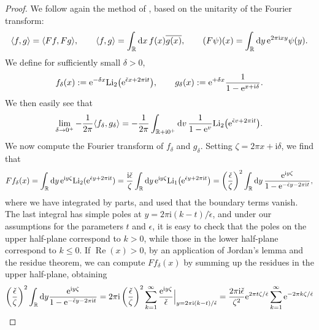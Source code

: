 \documentclass[pdftex]{sigma}
\numberwithin{equation}{section}
\begin{document}
\begin{proof}
We follow again the method of \cite{garoufalidis2020resurgence}, based on the unitarity of the
Fourier transform:
\[
\langle f,g\rangle=\langle Ff,Fg\rangle,\qquad \langle f,g\rangle=\int_{\mathbb{R}} \mathrm{d}x\, f(x)\overline{g(x)}, \qquad (F\psi)(x)=\int_{\mathbb{R}} {\rm d}y\, {\rm e}^{2\pi\mathrm{i} xy}\psi(y).
\]
We define for sufficiently small $\delta>0$,
\begin{equation*}
f_\delta(x):={\rm e}^{-\delta x}{\rm Li}_2\big({\rm e}^{\check\epsilon x
+2\pi \mathrm{i} t}\big),\qquad
g_\delta(x):={\rm e}^{+\delta x}\frac{1}{1-{\rm e}^{x+\mathrm{i}\delta}}.
\end{equation*}
We then easily see that
\begin{equation*}%
\lim_{\delta \to 0^+}-\frac{1}{2\pi}\langle f_\delta,g_\delta\rangle=-\frac{1}{2\pi}\int_{\mathbb{R}+\mathrm{i} 0^+}{\rm d}v\, \frac{1}{1-{\rm e}^v}\mathrm{Li}_2\big({\rm e}^{\check{\epsilon} v +2\pi \mathrm{i} t}\big).
\end{equation*}
We now compute the Fourier transform of $f_\delta$ and $g_\delta$. Setting $\zeta=2\pi x+\mathrm{i}\delta$, we find that
\begin{equation*}
 Ff_\delta(x)=\int_{\mathbb{R}}\mathrm{d}y \, {\rm e}^{\mathrm{i} y\zeta}\mathrm{Li}_2({\rm e}^{\check\epsilon y+2\pi \mathrm{i} t})=\frac{\mathrm{i}\check\epsilon}{\zeta}\int_{\mathbb{R}}{\rm d}y\, {\rm e}^{\mathrm{i} y\zeta}\mathrm{Li}_1\big({\rm e}^{\check{\epsilon} y + 2\pi \mathrm{i} t}\big)=\left(\frac{\check \epsilon}{\zeta}\right)^2\int_{\mathbb{R}}{\rm d}y\, \frac{{\rm e}^{\mathrm{i} y \zeta}}{1-{\rm e}^{-\check{\epsilon} y -2\pi \mathrm{i} t}},
\end{equation*}
where we have integrated by parts, and used that the boundary terms vanish. The last integral has simple poles at $y=2\pi \mathrm{i}(k-t)/\check{\epsilon}$, and under our assumptions for the parameters $t$ and $\epsilon$, it is easy to check that the poles on the upper half-plane correspond to $k>0$, while those in the lower half-plane correspond to $k\leq 0$. If $\operatorname{Re}(x)>0$, by an application of Jordan's lemma and the residue theorem, we can compute $Ff_\delta(x)$ by summing up the residues in the upper half-plane, obtaining
\begin{align*}
 \left(\frac{\check \epsilon}{\zeta}\right)^2\int_{\mathbb{R}}{\rm d}y \frac{{\rm e}^{\mathrm{i} y \zeta}}{1-{\rm e}^{-\check{\epsilon} y -2\pi \mathrm{i} t}}&=2\pi \mathrm{i} \left(\frac{\check \epsilon}{\zeta}\right)^2\sum_{k=1}^{\infty}\frac{{\rm e}^{\mathrm{i} y\zeta}}{\check{\epsilon}}\Big|_{y=2\pi \mathrm{i} (k-t)/\check{\epsilon}}=\frac{2\pi \mathrm{i}\check\epsilon}{\zeta^2}{\rm e}^{2\pi t\zeta /\check{\epsilon}}\sum_{k=1}^{\infty}{\rm e}^{-2\pi k\zeta/\check{\epsilon} }\\

\end{align*}
\end{proof}
\end{document}
